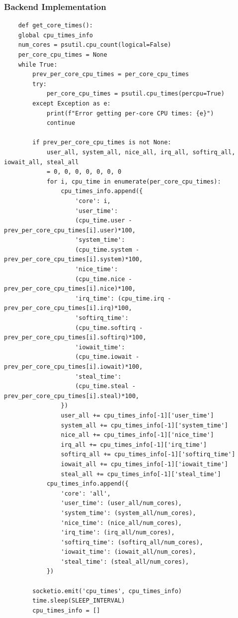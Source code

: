 \documentclass[12pt]{article}
\begin{document}
\subsubsection{Backend Implementation}
\begin{verbatim}
    def get_core_times():
    global cpu_times_info
    num_cores = psutil.cpu_count(logical=False)
    per_core_cpu_times = None
    while True:
        prev_per_core_cpu_times = per_core_cpu_times
        try:
            per_core_cpu_times = psutil.cpu_times(percpu=True)
        except Exception as e:
            print(f"Error getting per-core CPU times: {e}")
            continue
        
        if prev_per_core_cpu_times is not None:
            user_all, system_all, nice_all, irq_all, softirq_all, iowait_all, steal_all 
            = 0, 0, 0, 0, 0, 0, 0 
            for i, cpu_time in enumerate(per_core_cpu_times):
                cpu_times_info.append({
                    'core': i,
                    'user_time':
                    (cpu_time.user - prev_per_core_cpu_times[i].user)*100,
                    'system_time': 
                    (cpu_time.system - prev_per_core_cpu_times[i].system)*100,
                    'nice_time': 
                    (cpu_time.nice - prev_per_core_cpu_times[i].nice)*100,
                    'irq_time': (cpu_time.irq - prev_per_core_cpu_times[i].irq)*100,
                    'softirq_time': 
                    (cpu_time.softirq - prev_per_core_cpu_times[i].softirq)*100,
                    'iowait_time': 
                    (cpu_time.iowait - prev_per_core_cpu_times[i].iowait)*100,
                    'steal_time': 
                    (cpu_time.steal - prev_per_core_cpu_times[i].steal)*100,
                })
                user_all += cpu_times_info[-1]['user_time']
                system_all += cpu_times_info[-1]['system_time']
                nice_all += cpu_times_info[-1]['nice_time']
                irq_all += cpu_times_info[-1]['irq_time']
                softirq_all += cpu_times_info[-1]['softirq_time']
                iowait_all += cpu_times_info[-1]['iowait_time']
                steal_all += cpu_times_info[-1]['steal_time']
            cpu_times_info.append({
                'core': 'all',
                'user_time': (user_all/num_cores),
                'system_time': (system_all/num_cores),
                'nice_time': (nice_all/num_cores),
                'irq_time': (irq_all/num_cores),
                'softirq_time': (softirq_all/num_cores),
                'iowait_time': (iowait_all/num_cores),
                'steal_time': (steal_all/num_cores),
            })
       
        socketio.emit('cpu_times', cpu_times_info)
        time.sleep(SLEEP_INTERVAL)
        cpu_times_info = []
\end{verbatim}
\end{document}
